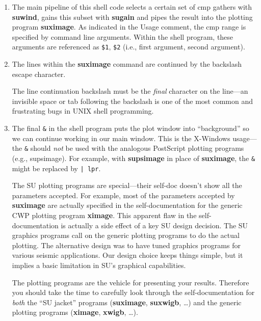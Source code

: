 {{{{{{{\begin{enumerate}
{\bf WARNING!\/}  Spaces are significant to the UNIX shell---it  uses
them to parse command lines.  So despite all we've learned about
making code easy to read, do {\em not} put spaces next to the \verb:=: symbol.
(Somewhere around 1977, one author's (Jack) first attempt to learn UNIX was
derailed for several weeks by making this mistake.)

\item The main pipeline of this shell code selects a certain set of cmp gathers with {\bf suwind}, gains this subset with {\bf sugain\/} and pipes the result into
the plotting program {\bf suximage}.  As indicated in the Usage comment,
the cmp range is specified by command line arguments.
Within the shell program, these arguments are
referenced as \verb:$1:, \verb:$2: (i.e., first argument, second argument).

\item The lines within the {\bf suximage\/} command are continued by the
backslash escape character.

  The line continuation backslash must be the {\em final}
character on the line---an invisible space or tab following the
backslash is one of the most common and frustrating bugs in UNIX
shell programming.

\item The final \verb:&: in the shell program
puts the plot window into ``background'' so we can continue
working in our main window.  This is the X-Windows
usage---the \verb:&: should {\em not} be used with the analogous PostScript
plotting programs (e.g., supsimage).  For example, with {\bf supsimage\/} in
place of {\bf suximage}, the \verb:&: might be replaced by \verb:| lpr:.

The {\small\sf SU} plotting programs are special---their self-doc doesn't
show all the parameters accepted.  For example, most of the parameters
accepted by {\bf suximage\/}
are actually specified in the self-documentation for the
generic {\small\sf CWP} plotting program {\bf ximage}.  This apparent flaw
in the self-documentation is actually a side
effect of a key {\small\sf SU} design decision.  The {\small\sf SU} graphics
programs call on the generic plotting programs to do the actual plotting.
The alternative design was to have tuned graphics programs
for various seismic applications.
Our design choice keeps things simple,
but it implies a basic limitation in {\small\sf SU}'s graphical capabilities.

The plotting programs are the vehicle for presenting your results.
Therefore you should take the time to carefully look
through the self-documentation for {\em both} the ``{\small\sf SU} jacket'' programs
({\bf suximage}, {\bf suxwigb}, \ldots) and the generic plotting
programs ({\bf ximage}, {\bf xwigb}, \ldots).


\end{enumerate}}}}}}}}
